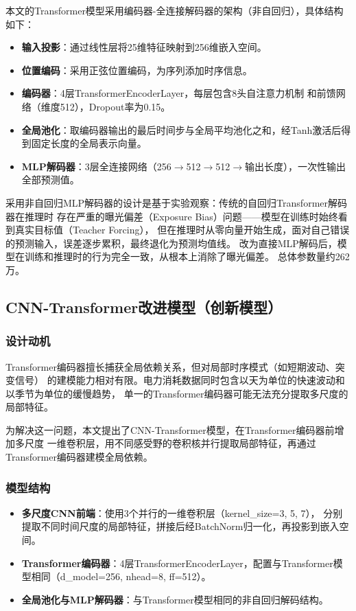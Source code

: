 \documentclass[12pt,a4paper]{ctexart}
\begin{document}
本文的Transformer模型采用编码器-全连接解码器的架构（非自回归），具体结构如下：
\begin{itemize}[nosep]
    \item \textbf{输入投影}：通过线性层将25维特征映射到256维嵌入空间。
    \item \textbf{位置编码}：采用正弦位置编码，为序列添加时序信息。
    \item \textbf{编码器}：4层TransformerEncoderLayer，每层包含8头自注意力机制
    和前馈网络（维度512），Dropout率为0.15。
    \item \textbf{全局池化}：取编码器输出的最后时间步与全局平均池化之和，经Tanh激活后得到固定长度的全局表示向量。
    \item \textbf{MLP解码器}：3层全连接网络（256$\to$512$\to$512$\to$输出长度），一次性输出全部预测值。
\end{itemize}

采用非自回归MLP解码器的设计是基于实验观察：传统的自回归Transformer解码器在推理时
存在严重的曝光偏差（Exposure Bias）问题——模型在训练时始终看到真实目标值（Teacher Forcing），
但在推理时从零向量开始生成，面对自己错误的预测输入，误差逐步累积，最终退化为预测均值线。
改为直接MLP解码后，模型在训练和推理时的行为完全一致，从根本上消除了曝光偏差。
总体参数量约262万。

\subsection{CNN-Transformer改进模型（创新模型）}

\subsubsection{设计动机}

Transformer编码器擅长捕获全局依赖关系，但对局部时序模式（如短期波动、突变信号）
的建模能力相对有限。电力消耗数据同时包含以天为单位的快速波动和以季节为单位的缓慢趋势，
单一的Transformer编码器可能无法充分提取多尺度的局部特征。

为解决这一问题，本文提出了CNN-Transformer模型，在Transformer编码器前增加多尺度
一维卷积层，用不同感受野的卷积核并行提取局部特征，再通过Transformer编码器建模全局依赖。

\subsubsection{模型结构}

\begin{itemize}[nosep]
    \item \textbf{多尺度CNN前端}：使用3个并行的一维卷积层（kernel\_size=3, 5, 7），
    分别提取不同时间尺度的局部特征，拼接后经BatchNorm归一化，再投影到嵌入空间。
    \item \textbf{Transformer编码器}：4层TransformerEncoderLayer，配置与Transformer模型相同（d\_model=256, nhead=8, ff=512）。
    \item \textbf{全局池化与MLP解码器}：与Transformer模型相同的非自回归解码结构。
\end{itemize}
\end{document}
